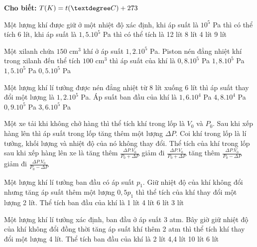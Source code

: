 \textbf{Cho biết:} $T(K) = t(\textdegree C) + 273$


\begin{ex}
Một lượng khí được giữ ở một nhiệt độ xác định, khi áp suất là $10^5$ Pa thì có thể tích 6 lít, khi áp suất là $1,5.10^5$ Pa thì có thể tích là
\choice
{12 lít}
{8 lít}
{4 lít}
{9 lít}
\end{ex}

\begin{ex}
Một xilanh chứa $150 \text{ cm}^3$ khí ở áp suất $1,2.10^5$ Pa. Piston nén đẳng nhiệt khí trong xilanh đến thể tích $100 \text{ cm}^3$ thì áp suất của khí là
\choice
{$0,8.10^5$ Pa}
{$1,8.10^5$ Pa}
{$1,5.10^5$ Pa}
{$0,5.10^5$ Pa}
\end{ex}

\begin{ex}
Một lượng khí lí tưởng được nén đẳng nhiệt từ 8 lít xuống 6 lít thì áp suất thay đổi một lượng là $1,2.10^5$ Pa. Áp suất ban đầu của khí là
\choice
{$1,6.10^4$ Pa}
{$4,8.10^4$ Pa}
{$0,9.10^5$ Pa}
{$3,6.10^5$ Pa}
\end{ex}

\begin{ex}
Một xe tải khi không chở hàng thì thể tích khí trong lốp là $V_0$ và $P_0$. Sau khi xếp hàng lên thì áp suất trong lốp tăng thêm một lượng $\Delta P$. Coi khí trong lốp là lí tưởng, khối lượng và nhiệt độ của nó không thay đổi. Thể tích của khí trong lốp sau khi xếp hàng lên xe là
\choice
{tăng thêm $\frac{\Delta P.V_0}{P_0 + \Delta P}$}
{giảm đi $\frac{\Delta P.V_0}{P_0 + \Delta P}$}
{tăng thêm $\frac{\Delta P.V_0}{P_0 - \Delta P}$}
{giảm đi $\frac{\Delta P.V_0}{P_0 - \Delta P}$}
\end{ex}

\begin{ex}
Một lượng khí lí tưởng ban đầu có áp suất $p_1$. Giữ nhiệt độ của khí không đổi nhưng tăng áp suất thêm một lượng $0,5p_1$ thì thể tích của khí thay đổi một lượng 2 lít. Thể tích ban đầu của khí là
\choice
{1 lít}
{4 lít}
{6 lít}
{3 lít}
\end{ex}

\begin{ex}
Một lượng khí lí tưởng xác định, ban đầu ở áp suất 3 atm. Bây giờ giữ nhiệt độ của khí không đổi đồng thời tăng áp suất khí thêm 2 atm thì thể tích khí thay đổi một lượng 4 lít. Thể tích ban đầu của khí là
\choice
{2 lít}
{4,4 lít}
{10 lít}
{6 lít}
\end{ex}

